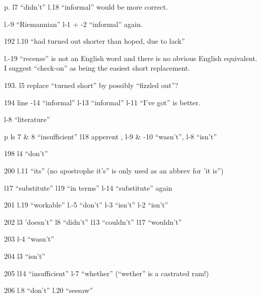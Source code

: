 

p. l7 ``didn't'' l.18 ``informal'' would be more correct.

l.-9 ``Riemannian'' l-1 + -2 ``informal'' again.

192 l.10 ``had turned out shorter than hoped, due to lack''

l.-19 ``recense'' is not an English word and there is no obvious English equivalent. I suggest ``check-on'' as being the easiest short replacement.

193. l5  replace ``turned short'' by possibly ``fizzled out''?

{\reversemarginpar{}} 194 line -14 ``informal'' l-13 ``informal'' l-11 ``I've got'' is better.

l-8 ``literature''

p ls 7 \& 8 ``insufficient'' l18 apperent , l-9 \& -10 ``wasn't'', l-8 ``isn't''

198 l4 ``don't''

200 l.11 ``its'' (no apostrophe it's'' is only used as an abbrev for 'it is'')

l17 ``substitute'' l19 ``in terms'' l-14 ``substitute'' again

201 l.19 ``workable'' l.-5 ``don't'' l-3 ``isn't'' l-2 ``isn't''

202 l3 'doesn't'' l8 ``didn't'' l13 ``couldn't'' l17 ``wouldn't''

203 l-4 ``wasn't''

204 l3 ``isn't''

205 l14 ``insufficient'' l-7 ``whether'' (``wether'' is a castrated ram!)

206 l.8 ``don't'' l.20 ``seesaw''

